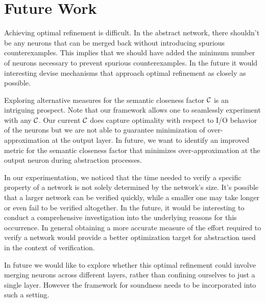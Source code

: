 \section{Future Work}
Achieving optimal refinement is difficult. In the abstract network, 
there shouldn't be any neurons that can be merged back without introducing 
spurious counterexamples. This implies that we should have added the minimum number of 
neurons necessary to prevent spurious counterexamples. In the future it would 
interesting devise mechanisms that approach optimal refinement as
closely as possible.

Exploring alternative measures for the semantic closeness factor $\mathcal{C}$ 
is an intriguing prospect. Note that our framework allows one to seamlessly 
experiment  with any $\mathcal{C}$.  Our current $\mathcal{C}$ does capture optimality with respect 
to I/O behavior of the neurons but we are not able to guarantee minimization of
over-approximation at the output layer. In future, we want to identify an
improved metric for the semantic closeness factor that minimizes 
over-approximation at the output neuron during abstraction processes. 

In our experimentation, we noticed that the time needed to verify a specific 
property of a network is not solely determined by the network's size. It's possible 
that a larger network can be verified quickly, while a smaller one may take longer 
or even fail to be verified altogether. In the future, it would be interesting
to conduct a comprehensive investigation into the underlying reasons 
for this occurrence. In general obtaining a more accurate 
measure of the effort required to verify a network would provide a better optimization
target for abstraction used in the context of verification.

In future we would like to explore whether this optimal refinement 
could involve merging neurons across different layers, rather than confining 
ourselves to just a single layer. However the framework for soundness needs to be
incorporated into such a setting.








